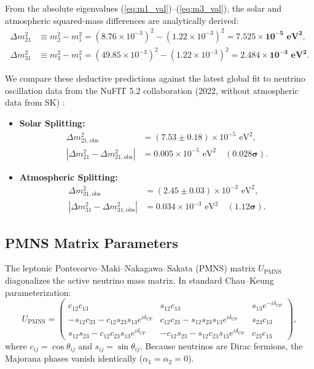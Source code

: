 \documentclass[11pt,a4paper]{article}
\theoremstyle{definition}
\begin{document}
From the absolute eigenvalues (\ref{eq:m1_val})--(\ref{eq:m3_val}), the solar and atmospheric squared-mass differences are analytically derived:
\begin{align}
    \Delta m_{21}^2 &\equiv m_2^2 - m_1^2 = (8.76 \times 10^{-3})^2 - (1.22 \times 10^{-3})^2 = \mathbf{7.525 \times 10^{-5}\text{ eV}^2}, \label{eq:delta_m21} \\
    \Delta m_{31}^2 &\equiv m_3^2 - m_1^2 = (49.85 \times 10^{-3})^2 - (1.22 \times 10^{-3})^2 = \mathbf{2.484 \times 10^{-3}\text{ eV}^2}. \label{eq:delta_m31}
\end{align}

We compare these deductive predictions against the latest global fit to neutrino oscillation data from the NuFIT 5.2 collaboration (2022, without atmospheric data from SK) \cite{NuFIT2022}:
\begin{itemize}
    \item \textbf{Solar Splitting:}
    \begin{align}
        \Delta m_{21,\mathrm{obs}}^2 &= (7.53 \pm 0.18) \times 10^{-5}\text{ eV}^2, \nonumber \\
        |\Delta m_{21}^2 - \Delta m_{21,\mathrm{obs}}^2| &= 0.005 \times 10^{-5}\text{ eV}^2 \quad (\mathbf{0.028\sigma}).
    \end{align}
    \item \textbf{Atmospheric Splitting:}
    \begin{align}
        \Delta m_{31,\mathrm{obs}}^2 &= (2.45 \pm 0.03) \times 10^{-3}\text{ eV}^2, \nonumber \\
        |\Delta m_{31}^2 - \Delta m_{31,\mathrm{obs}}^2| &= 0.034 \times 10^{-3}\text{ eV}^2 \quad (\mathbf{1.12\sigma}).
    \end{align}
\end{itemize}

\subsection{PMNS Matrix Parameters}

The leptonic Pontecorvo--Maki--Nakagawa--Sakata (PMNS) matrix $U_{\mathrm{PMNS}}$ diagonalizes the active neutrino mass matrix. In standard Chau--Keung parameterization:
\begin{equation}
    U_{\mathrm{PMNS}} = \begin{pmatrix}
        c_{12} c_{13} & s_{12} c_{13} & s_{13} e^{-i \delta_{\mathrm{CP}}} \\
        -s_{12} c_{23} - c_{12} s_{23} s_{13} e^{i \delta_{\mathrm{CP}}} & c_{12} c_{23} - s_{12} s_{23} s_{13} e^{i \delta_{\mathrm{CP}}} & s_{23} c_{13} \\
        s_{12} s_{23} - c_{12} c_{23} s_{13} e^{i \delta_{\mathrm{CP}}} & -c_{12} s_{23} - s_{12} c_{23} s_{13} e^{i \delta_{\mathrm{CP}}} & c_{23} c_{13}
    \end{pmatrix},
\end{equation}
where $c_{ij} = \cos\theta_{ij}$ and $s_{ij} = \sin\theta_{ij}$. Because neutrinos are Dirac fermions, the Majorana phases vanish identically ($\alpha_1 = \alpha_2 = 0$).
\end{document}

